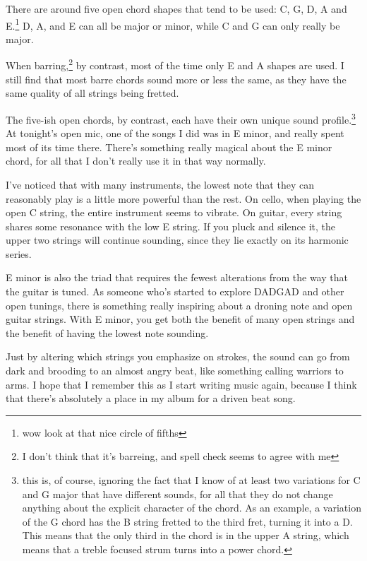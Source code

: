 \documentclass[12pt]{article}[titlepage]
\newcommand{\1}{\={a}}
\newcommand{\2}{\={e}}
\newcommand{\3}{\={\i}}
\newcommand{\4}{\=o}
\newcommand{\5}{\=u}
\newcommand{\6}{\={A}}
\renewcommand{\,}{\textsuperscript{,}}
\begin{document}
There are around five open chord shapes that tend to be used: C, G, D, A and E.\footnote{wow look at that nice circle of fifths}
D, A, and E can all be major or minor, while C and G can only really be major.

When barring,\footnote{I don't think that it's barreing, and spell check seems to agree with me} by contrast, most of the time only E and A shapes are used.
I still find that most barre chords sound more or less the same, as they have the same quality of all strings being fretted.

The five-ish open chords, by contrast, each have their own unique sound profile.\footnote{this is, of course, ignoring the fact that I know of at least two variations for C and G major that have different sounds, for all that they do not change anything about the explicit character of the chord. As an example, a variation of the G chord has the B string fretted to the third fret, turning it into a D. This means that the only third in the chord is in the upper A string, which means that a treble focused strum turns into a power chord.}
At tonight's open mic, one of the songs I did was in E minor, and really spent most of its time there.
There's something really magical about the E minor chord, for all that I don't really use it in that way normally.

I've noticed that with many instruments, the lowest note that they can reasonably play is a little more powerful than the rest.
On cello, when playing the open C string, the entire instrument seems to vibrate.
On guitar, every string shares some resonance with the low E string.
If you pluck and silence it, the upper two strings will continue sounding, since they lie exactly on its harmonic series.

E minor is also the triad that requires the fewest alterations from the way that the guitar is tuned.
As someone who's started to explore DADGAD and other open tunings, there is something really inspiring about a droning note and open guitar strings.
With E minor, you get both the benefit of many open strings and the benefit of having the lowest note sounding.

Just by altering which strings you emphasize on strokes, the sound can go from dark and brooding to an almost angry beat, like something calling warriors to arms.
I hope that I remember this as I start writing music again, because I think that there's absolutely a place in my album for a driven beat song.
\end{document}

